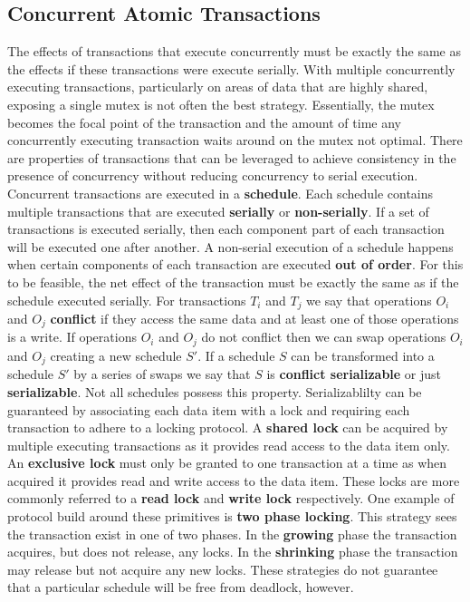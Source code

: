 \documentclass[10pt,a4paper]{article}
\begin{document}
\subsection{Concurrent Atomic Transactions}
The effects of transactions that execute concurrently must be exactly the same as the effects if these transactions were execute serially. With multiple concurrently executing transactions, particularly on areas of data that are highly shared, exposing a single mutex is not often the best strategy. Essentially, the mutex becomes the focal point of the transaction and the amount of time any concurrently executing transaction waits around on the mutex not optimal. There are properties of transactions that can be leveraged to achieve consistency in the presence of concurrency without reducing concurrency to serial execution. 
\newline\newline
Concurrent transactions are executed in a {\bf schedule}. Each schedule contains multiple transactions that are executed {\bf serially} or {\bf non-serially}. If a set of transactions is executed serially, then each component part of each transaction will be executed one after another. A non-serial execution of a schedule happens when certain components of each transaction are executed {\bf out of order}. For this to be feasible, the net effect of the transaction must be exactly the same as if the schedule executed serially. For transactions $T_i$ and $T_j$ we say that operations $O_i$ and $O_j$ {\bf conflict} if they access the same data and at least one of those operations is a write. If operations $O_i$ and $O_j$ do not conflict then we can swap operations $O_i$ and $O_j$ creating a new schedule $S'$. If a schedule $S$ can be transformed into a schedule $S'$ by a series of swaps we say that $S$ is {\bf conflict serializable} or just {\bf serializable}. Not all schedules possess this property. 
\newline\newline
Serializablilty can be guaranteed by associating each data item with a lock and requiring each transaction to adhere to a locking protocol. A {\bf shared lock} can be acquired by multiple executing transactions as it provides read access to the data item only. An {\bf exclusive lock} must only be granted to one transaction at a time as when acquired it provides read and write access to the data item. These locks are more commonly referred to a {\bf read lock} and {\bf write lock} respectively. One example of protocol build around these primitives is {\bf two phase locking}. This strategy sees the transaction exist in one of two phases. In the {\bf growing} phase the transaction acquires, but does not release, any locks. In the {\bf shrinking} phase the transaction may release but not acquire any new locks. These strategies do not guarantee that a particular schedule will be free from deadlock, however. 
\end{document}
